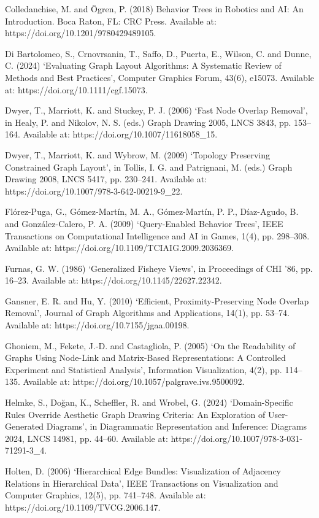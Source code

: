 \documentclass[11pt,a4paper,oneside,extrafontsizes]{memoir}
\begin{document}
Colledanchise, M. and Ögren, P. (2018) Behavior Trees in Robotics and AI: An Introduction. Boca Raton, FL: CRC Press. Available at: https://doi.org/10.1201/9780429489105.

Di Bartolomeo, S., Crnovrsanin, T., Saffo, D., Puerta, E., Wilson, C. and Dunne, C. (2024) ‘Evaluating Graph Layout Algorithms: A Systematic Review of Methods and Best Practices’, Computer Graphics Forum, 43(6), e15073. Available at: https://doi.org/10.1111/cgf.15073.

Dwyer, T., Marriott, K. and Stuckey, P. J. (2006) ‘Fast Node Overlap Removal’, in Healy, P. and Nikolov, N. S. (eds.) Graph Drawing 2005, LNCS 3843, pp. 153–164. Available at: https://doi.org/10.1007/11618058\_15.

Dwyer, T., Marriott, K. and Wybrow, M. (2009) ‘Topology Preserving Constrained Graph Layout’, in Tollis, I. G. and Patrignani, M. (eds.) Graph Drawing 2008, LNCS 5417, pp. 230–241. Available at: https://doi.org/10.1007/978-3-642-00219-9\_22.

Flórez-Puga, G., Gómez-Martín, M. A., Gómez-Martín, P. P., Díaz-Agudo, B. and González-Calero, P. A. (2009) ‘Query-Enabled Behavior Trees’, IEEE Transactions on Computational Intelligence and AI in Games, 1(4), pp. 298–308. Available at: https://doi.org/10.1109/TCIAIG.2009.2036369.

Furnas, G. W. (1986) ‘Generalized Fisheye Views’, in Proceedings of CHI ’86, pp. 16–23. Available at: https://doi.org/10.1145/22627.22342.

Gansner, E. R. and Hu, Y. (2010) ‘Efficient, Proximity-Preserving Node Overlap Removal’, Journal of Graph Algorithms and Applications, 14(1), pp. 53–74. Available at: https://doi.org/10.7155/jgaa.00198.

Ghoniem, M., Fekete, J.-D. and Castagliola, P. (2005) ‘On the Readability of Graphs Using Node-Link and Matrix-Based Representations: A Controlled Experiment and Statistical Analysis’, Information Visualization, 4(2), pp. 114–135. Available at: https://doi.org/10.1057/palgrave.ivs.9500092.

Helmke, S., Doğan, K., Scheffler, R. and Wrobel, G. (2024) ‘Domain-Specific Rules Override Aesthetic Graph Drawing Criteria: An Exploration of User-Generated Diagrams’, in Diagrammatic Representation and Inference: Diagrams 2024, LNCS 14981, pp. 44–60. Available at: https://doi.org/10.1007/978-3-031-71291-3\_4.

Holten, D. (2006) ‘Hierarchical Edge Bundles: Visualization of Adjacency Relations in Hierarchical Data’, IEEE Transactions on Visualization and Computer Graphics, 12(5), pp. 741–748. Available at: https://doi.org/10.1109/TVCG.2006.147.
\end{document}
